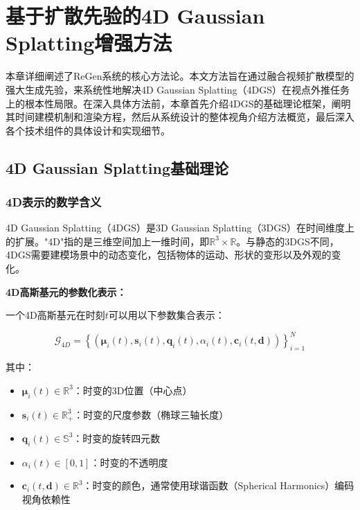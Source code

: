 
\chapter{基于扩散先验的4D Gaussian Splatting增强方法}

本章详细阐述了ReGen系统的核心方法论。本文方法旨在通过融合视频扩散模型的强大生成先验，来系统性地解决4D Gaussian Splatting（4DGS）在视点外推任务上的根本性局限。在深入具体方法前，本章首先介绍4DGS的基础理论框架，阐明其时间建模机制和渲染方程，然后从系统设计的整体视角介绍方法概览，最后深入各个技术组件的具体设计和实现细节。

\section{4D Gaussian Splatting基础理论}

\subsection{4D表示的数学含义}

4D Gaussian Splatting（4DGS）是3D Gaussian Splatting（3DGS）在时间维度上的扩展。"4D"指的是三维空间加上一维时间，即$\mathbb{R}^3 \times \mathbb{R}$。与静态的3DGS不同，4DGS需要建模场景中的动态变化，包括物体的运动、形状的变形以及外观的变化。

\textbf{4D高斯基元的参数化表示：}

一个4D高斯基元在时刻$t$可以用以下参数集合表示：

\begin{equation}
\mathcal{G}_{4D} = \left\{(\boldsymbol{\mu}_i(t), \mathbf{s}_i(t), \mathbf{q}_i(t), \alpha_i(t), \mathbf{c}_i(t, \mathbf{d}))\right\}_{i=1}^{N}
\label{eq:4dgs_parameterization}
\end{equation}

其中：
\begin{itemize}
\item $\boldsymbol{\mu}_i(t) \in \mathbb{R}^3$：时变的3D位置（中心点）
\item $\mathbf{s}_i(t) \in \mathbb{R}^3_+$：时变的尺度参数（椭球三轴长度）
\item $\mathbf{q}_i(t) \in \mathbb{S}^3$：时变的旋转四元数
\item $\alpha_i(t) \in [0,1]$：时变的不透明度
\item $\mathbf{c}_i(t, \mathbf{d}) \in \mathbb{R}^3$：时变的颜色，通常使用球谐函数（Spherical Harmonics）编码视角依赖性
\end{itemize}

